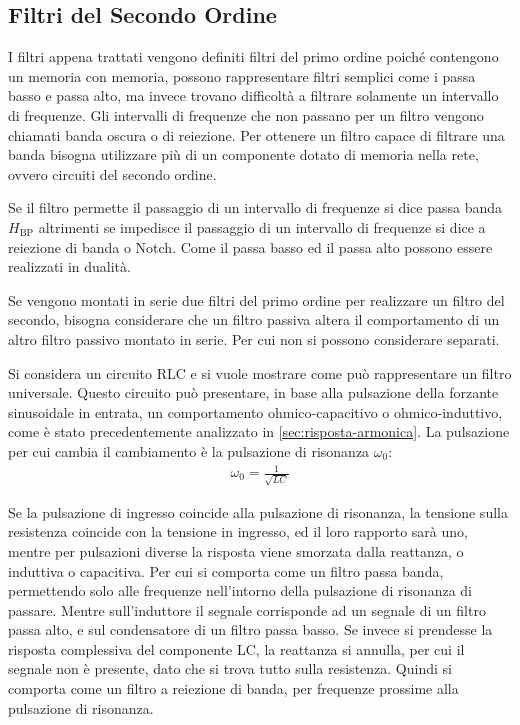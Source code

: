 \documentclass{article}
\numberwithin{equation}{subsection}
\begin{document}
\subsection{Filtri del Secondo Ordine} %

I filtri appena trattati vengono definiti filtri del primo ordine poiché contengono un memoria con memoria, possono rappresentare filtri semplici come i passa basso e 
passa alto, ma invece trovano difficoltà a filtrare solamente un intervallo di frequenze. Gli intervalli di frequenze che non passano per un filtro vengono chiamati 
banda oscura o di reiezione. Per ottenere un filtro capace di filtrare una banda bisogna utilizzare più di un componente dotato di memoria nella rete, ovvero circuiti del 
secondo ordine. 

Se il filtro permette il passaggio di un intervallo di frequenze si dice passa banda $H_{\mathrm{BP}}$ altrimenti se impedisce il passaggio di un intervallo di frequenze si dice 
a reiezione di banda o Notch. Come il passa basso ed il passa alto possono essere realizzati in dualità. 

Se vengono montati in serie due filtri del primo ordine per realizzare un filtro del secondo, bisogna considerare che un filtro passiva altera il comportamento di 
un altro filtro passivo montato in serie. Per cui non si possono considerare separati. 

Si considera un circuito RLC e si vuole mostrare come può rappresentare un filtro universale. Questo circuito può presentare, in base alla pulsazione della forzante 
sinusoidale in entrata, un comportamento ohmico-capacitivo o ohmico-induttivo, come è stato precedentemente analizzato in \ref{sec:risposta-armonica}. 
La pulsazione per cui cambia il cambiamento è la pulsazione di risonanza $\omega_0$:
\begin{gather*}
    \omega_0=\displaystyle\frac{1}{\sqrt{LC}}
\end{gather*}

Se la pulsazione di ingresso coincide alla pulsazione di risonanza, la tensione sulla resistenza coincide con la tensione in ingresso, ed il loro rapporto sarà uno, mentre 
per pulsazioni diverse la risposta viene smorzata dalla reattanza, o induttiva o capacitiva. Per cui si comporta come un filtro passa banda, permettendo solo alle 
frequenze nell'intorno della pulsazione di risonanza di passare. 
Mentre sull'induttore il segnale corrisponde ad un segnale di un filtro passa alto, e sul condensatore di un filtro passa basso. Se invece si prendesse la risposta 
complessiva del componente LC, la reattanza si annulla, per cui il segnale non è presente, dato che si trova tutto sulla resistenza. Quindi si comporta come un filtro 
a reiezione di banda, per frequenze prossime alla pulsazione di risonanza. 
\end{document}
